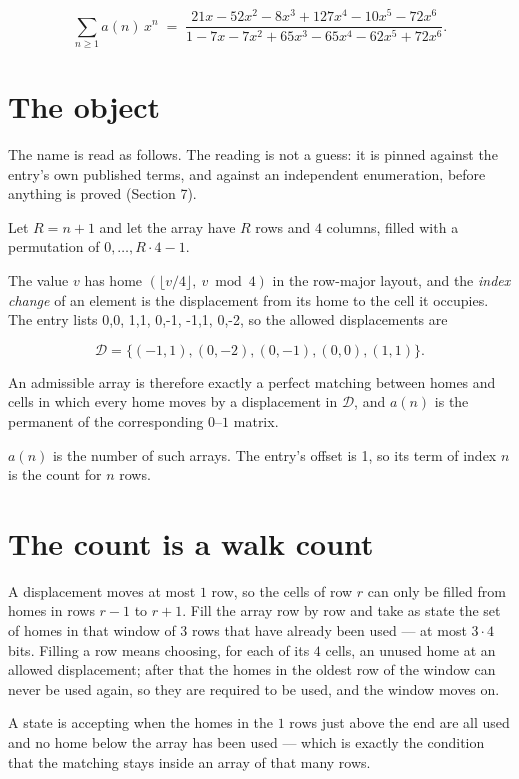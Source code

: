 \documentclass[11pt]{article}
\theoremstyle{definition}
\begin{document}
\[\sum_{n \ge 1} a(n)\,x^n \;=\; \frac{21x - 52x^{2} - 8x^{3} + 127x^{4} - 10x^{5} - 72x^{6}}{1 - 7x - 7x^{2} + 65x^{3} - 65x^{4} - 62x^{5} + 72x^{6}}.\]

\section{The object}

The name is read as follows. The reading is not a guess: it is pinned against the entry's own published terms, and against an independent enumeration, before anything is proved (Section 7).

Let $R = n + 1$ and let the array have $R$ rows and $4$ columns, filled with a permutation of $0,\dots,R\cdot4-1$.

The value $v$ has home $(\lfloor v/4\rfloor,\ v \bmod 4)$ in the row-major layout, and the {\itshape index change} of an element is the displacement from its home to the cell it occupies. The entry lists 0,0, 1,1, 0,-1, -1,1, 0,-2, so the allowed displacements are

\[\mathcal{D} = \{(-1,1), (0,-2), (0,-1), (0,0), (1,1)\}.\]

An admissible array is therefore exactly a perfect matching between homes and cells in which every home moves by a displacement in $\mathcal{D}$, and $a(n)$ is the permanent of the corresponding $0$--$1$ matrix.

$a(n)$ is the number of such arrays. The entry's offset is 1, so its term of index $n$ is the count for $n$ rows.

\section{The count is a walk count}

A displacement moves at most $1$ row, so the cells of row $r$ can only be filled from homes in rows $r-1$ to $r+1$. Fill the array row by row and take as state the set of homes in that window of $3$ rows that have already been used --- at most $3\cdot4$ bits. Filling a row means choosing, for each of its $4$ cells, an unused home at an allowed displacement; after that the homes in the oldest row of the window can never be used again, so they are required to be used, and the window moves on.

A state is accepting when the homes in the $1$ rows just above the end are all used and no home below the array has been used --- which is exactly the condition that the matching stays inside an array of that many rows.
\end{document}
